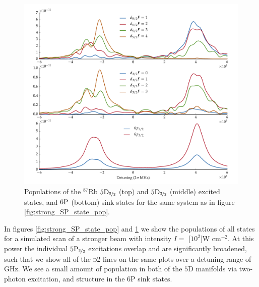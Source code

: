     \begin{figure}%
    \includegraphics[width=\linewidth]{figs/05_twophoton/rb87_5spd6p_hf_2_solve_scan_e02_FIXED_1e2W_fig2.pdf}
    \caption{
    Populations of the $^{87}$Rb $5\rm{D}_{\nicefrac{5}{2}}$
    (top) and $5\rm{D}_{\nicefrac{3}{2}}$ (middle) excited states, and
    $6\rm{P}$ (bottom) sink states for the same system as in figure 
    \ref{fig:strong_SP_state_pop}.
    }
    \label{fig:strong_D6P_state_pop} 
    \end{figure} 

    In figures \ref{fig:strong_SP_state_pop} and \ref{fig:strong_D6P_state_pop}
    we show the populations of all states for a simulated scan of a stronger
    beam with intensity $I = $ \unit[$10^2$]{W cm$^{-2}$}. At this power the
    individual $5\rm{P}_{\nicefrac{3}{2}}$ excitations overlap and are
    significantly broadened, such that we show all of the \textsc{d2} lines on
    the same plots over a detuning range of \unit[12]{GHz}. We see a small
    amount of population in both of the $5$D manifolds via  two-photon
    excitation, and structure in the $6$P sink states.

